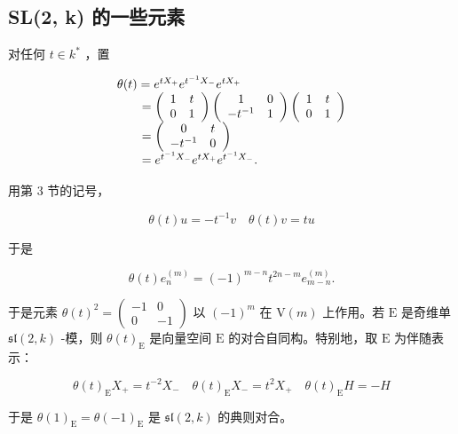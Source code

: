 \subsection{SL(2, k) 的一些元素}

对任何 \(t\in k^{*}\) ，置

\[
\begin{array}{l} \theta (t) = e ^ {t X _ {+}} e ^ {t ^ {- 1} X _ {-}} e ^ {t X _ {+}} \\ \qquad = \left( \begin{array}{c c} 1 & t \\ 0 & 1 \end{array} \right) \left( \begin{array}{c c} 1 & 0 \\ - t ^ {- 1} & 1 \end{array} \right) \left( \begin{array}{c c} 1 & t \\ 0 & 1 \end{array} \right) \\ \qquad = \left( \begin{array}{c c} 0 & t \\ - t ^ {- 1} & 0 \end{array} \right) \\ \qquad = e ^ {t ^ {- 1} X _ {-}} e ^ {t X _ {+}} e ^ {t ^ {- 1} X _ {-}}. \end{array}
\]

用第 3 节的记号，

\[
\theta (t) u = - t ^ {- 1} v \quad \theta (t) v = t u
\]

于是

\[
\theta (t) e _ {n} ^ {(m)} = (- 1) ^ {m - n} t ^ {2 n - m} e _ {m - n} ^ {(m)}.\tag{4}
\]

于是元素 \(\theta(t)^2 = \left( \begin{array}{cc} -1 & 0 \\ 0 & -1 \end{array} \right)\) 以 \((-1)^m\) 在 \(\mathrm{V}(m)\) 上作用。若 \(\mathrm{E}\) 是奇维单 \(\mathfrak{sl}(2,k)\) -模，则 \(\theta(t)_{\mathrm{E}}\) 是向量空间 \(\mathrm{E}\) 的对合自同构。特别地，取 \(\mathrm{E}\) 为伴随表示：

\[
\theta (t) _ {\mathrm{E}} X _ {+} = t ^ {- 2} X _ {-} \quad \theta (t) _ {\mathrm{E}} X _ {-} = t ^ {2} X _ {+} \quad \theta (t) _ {\mathrm{E}} H = - H\tag{5}
\]

于是 \(\theta(1)_{\mathrm{E}} = \theta(-1)_{\mathrm{E}}\) 是 \(\mathfrak{sl}(2,k)\) 的典则对合。


